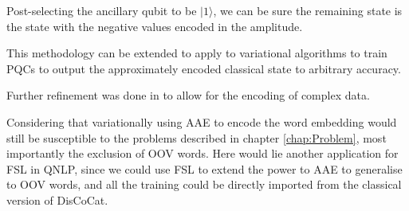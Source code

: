 Post-selecting the ancillary qubit to be $|1\rangle$, we can be sure the remaining state is the state with the negative values encoded in the amplitude.

This methodology can be extended to apply to variational algorithms to train PQCs to output the approximately encoded classical state to arbitrary accuracy.

Further refinement was done in \cite{mitsuda_approximate_2023} to allow for the encoding of complex data.

Considering that variationally using AAE to encode the word embedding would still be susceptible to the problems described in chapter \ref{chap:Problem}, most importantly the exclusion of OOV words. Here would lie another application for FSL in QNLP, since we could use FSL to extend the power to AAE to generalise to OOV words, and all the training could be directly imported from the classical version of DisCoCat.


